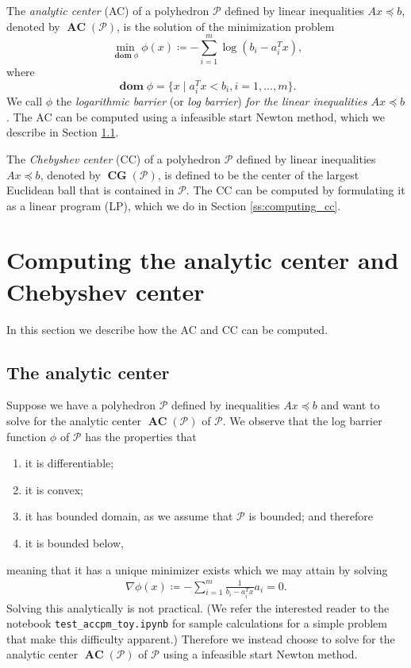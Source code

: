 \documentclass[11pt]{amsart}
\theoremstyle{definition}
\theoremstyle{remark}
\newcommand{\transpose}{T}
\DeclareMathOperator{\domain}{\textbf{dom}}
\DeclareMathOperator{\CG}{\textbf{CG}}
\DeclareMathOperator{\AC}{\textbf{AC}}
\begin{document}
        The \emph{analytic center} (AC) of a polyhedron $\mathcal{P}$ defined by linear inequalities $Ax \preceq b$, denoted by $\AC(\mathcal{P})$, is the solution of the minimization problem
        \begin{equation}\label{e:log_barrier_problem}
            \min_{\domain \phi} \phi(x) \coloneqq - \sum_{i=1}^{m}{\log{(b_i - a_i^\transpose x)}},
        \end{equation}        
        where
        \begin{equation*}
            \domain \phi = \{x \;|\; a_i^\transpose x < b_i, i = 1, \dots, m\}.
        \end{equation*}
        We call $\phi$ the \emph{logarithmic barrier} (or \emph{log barrier}) \emph{for the linear inequalities $Ax \preceq b$}. The AC can be  computed using a infeasible start Newton method, which we describe in Section \ref{ss:computing_ac}. 

        The \emph{Chebyshev center} (CC) of a polyhedron $\mathcal{P}$ defined by linear inequalities $Ax \preceq b$, denoted by $\CG(\mathcal{P})$,  is defined to be the center of the largest Euclidean ball that is contained in $\mathcal{P}$. The CC can be computed by formulating it as a linear program (LP), which we do in Section \ref{ss:computing_cc}.  


\section{Computing the analytic center and Chebyshev center}
    In this section we describe how the AC and CC can be computed.
    \subsection{The analytic center}\label{ss:computing_ac}
        Suppose we have a polyhedron $\mathcal{P}$ defined by inequalities $Ax \preceq b$ and want to solve for the analytic center $\AC(\mathcal{P})$ of $\mathcal{P}$. We observe that the log barrier function $\phi$ of $\mathcal{P}$ has the properties that 
        \begin{enumerate}
            \item it is differentiable; 
            \item it is convex;
            \item it has bounded domain, as we assume that $\mathcal{P}$ is bounded; and therefore
            \item it is bounded below, 
        \end{enumerate}
        meaning that it has a unique minimizer exists which we may attain by solving
        \begin{align*}
            \nabla \phi(x) \coloneqq - \sum_{i=1}^{m} \frac{1}{b_i - a_i^\transpose x}a_i = 0.     
        \end{align*} 
        Solving this analytically is not practical. (We refer the interested reader to the notebook \texttt{test\_accpm\_toy.ipynb} for sample calculations for a simple problem that make this difficulty apparent.) Therefore we instead choose to solve for the analytic center $\AC(\mathcal{P})$ of $\mathcal{P}$ using a infeasible start Newton method.
\end{document}
